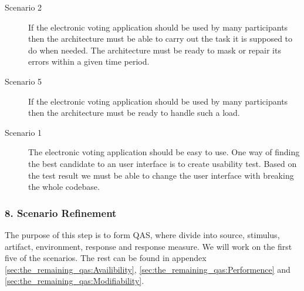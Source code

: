 \begin{description}
    \item [Scenario 2]
        If the electronic voting application should be used by many participants then the architecture must be able to carry out the task it is supposed to do when needed. The architecture must be ready to mask or repair its errors within a given time period.
     
     \item [Scenario 5]
        If the electronic voting application should be used by many participants then the architecture must be ready to handle such a load. 
        
    \item [Scenario 1]
        The electronic voting application should be easy to use. One way of finding the best candidate to an user interface is to create usability test. Based on the test result we must be able to change the user interface with breaking the whole codebase. 
  \end{description}


\subsubsection{8. Scenario Refinement}
The purpose of this step is to form QAS, where divide into source, stimulus, artifact, environment, response and response measure. We will work on the first five of the scenarios. The rest can be found in appendex \ref{sec:the_remaining_qas:Availibility}, \ref{sec:the_remaining_qas:Performence} and \ref{sec:the_remaining_qas:Modifiability}.


